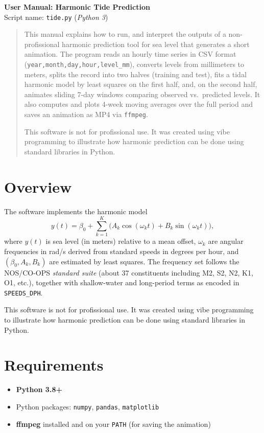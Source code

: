 \documentclass[11pt,a4paper]{article}
\begin{document}
\begin{center}
{\LARGE \textbf{User Manual: Harmonic Tide Prediction}}\\[0.5em]
\large Script name: \texttt{tide.py} \quad(\textit{Python 3})\\[0.25em]
\end{center}

\begin{abstract}
This manual explains how to run, and interpret the outputs of a non-profissional harmonic prediction tool for sea level that generates a short animation.  The program reads an hourly time series in CSV format (\texttt{year,month,day,hour,level\_mm}), converts levels from millimeters to meters, splits the record into two halves (training and test), fits a tidal harmonic model by least squares on the first half, and, on the second half, animates sliding 7-day windows comparing observed vs.\ predicted levels. It also computes and plots 4-week moving averages over the full period and saves an animation as MP4 via \texttt{ffmpeg}.

This software is not for profissional use. It was created using vibe programming to illustrate  how harmonic prediction can be done using  standard libraries in Python. 
\end{abstract}

\tableofcontents

\section{Overview}
The software implements the harmonic model
\[
y(t)=\beta_0+\sum_{k=1}^{K}\bigl(A_k\cos(\omega_k t)+B_k\sin(\omega_k t)\bigr),
\]
where $y(t)$ is sea level (in meters) relative to a mean offset, $\omega_k$ are angular frequencies in rad/s derived from standard speeds in degrees per hour, and $(\beta_0,A_k,B_k)$ are estimated by least squares. The frequency set follows the NOS/CO-OPS \emph{standard suite} (about 37 constituents including M2, S2, N2, K1, O1, etc.), together with shallow-water and long-period terms as encoded in \texttt{SPEEDS\_DPH}.

This software is not for profissional use. It was created using vibe programming to illustrate  how harmonic prediction can be done using  standard libraries in Python. 

\section{Requirements}
\begin{itemize}[leftmargin=1.5em]
  \item \textbf{Python 3.8+}
  \item Python packages: \texttt{numpy}, \texttt{pandas}, \texttt{matplotlib}
  \item \textbf{ffmpeg} installed and on your \texttt{PATH} (for saving the animation)
\end{itemize}
\end{document}
